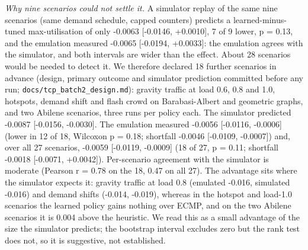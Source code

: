 \documentclass[journal]{IEEEtran}
\begin{document}
\textit{Why nine scenarios could not settle it.} A simulator replay of the same nine scenarios (same demand schedule, capped counters) predicts a learned-minus-tuned max-utilisation of only -0.0063 [-0.0146, +0.0010], 7 of 9 lower, p = 0.13, and the emulation measured -0.0065 [-0.0194, +0.0033]: the emulation agrees with the simulator, and both intervals are wider than the effect. About 28 scenarios would be needed to detect it. We therefore declared 18 further scenarios in advance (design, primary outcome and simulator prediction committed before any run; \texttt{docs/tcp\_batch2\_design.md}): gravity traffic at load 0.6, 0.8 and 1.0, hotspots, demand shift and flash crowd on Barabasi-Albert and geometric graphs, and two Abilene scenarios, three runs per policy each. The simulator predicted -0.0087 [-0.0156, -0.0030]. The emulation measured -0.0056 [-0.0116, -0.0006] (lower in 12 of 18, Wilcoxon p = 0.18; shortfall -0.0046 [-0.0109, -0.0007]) and, over all 27 scenarios, -0.0059 [-0.0119, -0.0009] (18 of 27, p = 0.11; shortfall -0.0018 [-0.0071, +0.0042]). Per-scenario agreement with the simulator is moderate (Pearson r = 0.78 on the 18, 0.47 on all 27). The advantage sits where the simulator expects it: gravity traffic at load 0.8 (emulated -0.016, simulated -0.016) and demand shifts (-0.014, -0.019), whereas in the hotspot and load-1.0 scenarios the learned policy gains nothing over ECMP, and on the two Abilene scenarios it is 0.004 above the heuristic. We read this as a small advantage of the size the simulator predicts; the bootstrap interval excludes zero but the rank test does not, so it is suggestive, not established.
\end{document}
